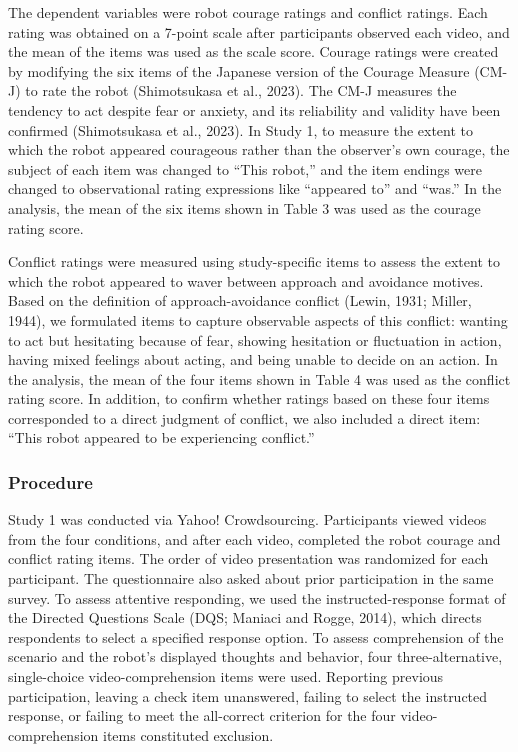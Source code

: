 \documentclass[utf8]{FrontiersinHarvard}
\begin{document}
The dependent variables were robot courage ratings and conflict ratings. Each rating was obtained on a 7-point scale after participants observed each video, and the mean of the items was used as the scale score. Courage ratings were created by modifying the six items of the Japanese version of the Courage Measure (CM-J) to rate the robot (Shimotsukasa et al., 2023). The CM-J measures the tendency to act despite fear or anxiety, and its reliability and validity have been confirmed (Shimotsukasa et al., 2023). In Study 1, to measure the extent to which the robot appeared courageous rather than the observer's own courage, the subject of each item was changed to ``This robot,'' and the item endings were changed to observational rating expressions like ``appeared to'' and ``was.'' In the analysis, the mean of the six items shown in Table 3 was used as the courage rating score.

Conflict ratings were measured using study-specific items to assess the extent to which the robot appeared to waver between approach and avoidance motives. Based on the definition of approach-avoidance conflict (Lewin, 1931; Miller, 1944), we formulated items to capture observable aspects of this conflict: wanting to act but hesitating because of fear, showing hesitation or fluctuation in action, having mixed feelings about acting, and being unable to decide on an action. In the analysis, the mean of the four items shown in Table 4 was used as the conflict rating score. In addition, to confirm whether ratings based on these four items corresponded to a direct judgment of conflict, we also included a direct item: ``This robot appeared to be experiencing conflict.''

\subsubsection{Procedure}\label{procedure}

Study 1 was conducted via Yahoo! Crowdsourcing. Participants viewed videos from the four conditions, and after each video, completed the robot courage and conflict rating items. The order of video presentation was randomized for each participant. The questionnaire also asked about prior participation in the same survey. To assess attentive responding, we used the instructed-response format of the Directed Questions Scale (DQS; Maniaci and Rogge, 2014), which directs respondents to select a specified response option. To assess comprehension of the scenario and the robot's displayed thoughts and behavior, four three-alternative, single-choice video-comprehension items were used. Reporting previous participation, leaving a check item unanswered, failing to select the instructed response, or failing to meet the all-correct criterion for the four video-comprehension items constituted exclusion.
\end{document}
